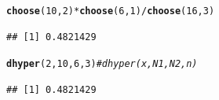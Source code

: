 \documentclass[t,xcolor=pdftex,dvipsnames,table]{beamer}\usepackage[]{graphicx}\usepackage[]{color}
\makeatletter
\newcommand{\hlnum}[1]{\textcolor[rgb]{0.686,0.059,0.569}{#1}}%
\newcommand{\hlcom}[1]{\textcolor[rgb]{0.678,0.584,0.686}{\textit{#1}}}%
\newcommand{\hlopt}[1]{\textcolor[rgb]{0,0,0}{#1}}%
\newcommand{\hlstd}[1]{\textcolor[rgb]{0.345,0.345,0.345}{#1}}%
\newcommand{\hlkwd}[1]{\textcolor[rgb]{0.737,0.353,0.396}{\textbf{#1}}}%
\newenvironment{kframe}{%
 \def\at@end@of@kframe{}%
 \ifinner\ifhmode%
  \def\at@end@of@kframe{\end{minipage}}%
  \begin{minipage}{\columnwidth}%
 \fi\fi%
 \def\FrameCommand##1{\hskip\@totalleftmargin \hskip-\fboxsep
 \colorbox{shadecolor}{##1}\hskip-\fboxsep
     \hskip-\linewidth \hskip-\@totalleftmargin \hskip\columnwidth}%
 \MakeFramed {\advance\hsize-\width
   \@totalleftmargin\z@ \linewidth\hsize
   \@setminipage}}%
 {\par\unskip\endMakeFramed%
 \at@end@of@kframe}
\newenvironment{knitrout}{}{} %
\makeatother
\begin{document}
\begin{frame}[fragile]{}
\begin{knitrout}
\color{fgcolor}\begin{kframe}
\begin{alltt}
\hlkwd{choose}\hlstd{(}\hlnum{10}\hlstd{,}\hlnum{2}\hlstd{)}\hlopt{*}\hlkwd{choose}\hlstd{(}\hlnum{6}\hlstd{,}\hlnum{1}\hlstd{)}\hlopt{/}\hlkwd{choose}\hlstd{(}\hlnum{16}\hlstd{,}\hlnum{3}\hlstd{)}
\end{alltt}
\begin{verbatim}
## [1] 0.4821429
\end{verbatim}
\end{kframe}
\end{knitrout}

\begin{knitrout}
\color{fgcolor}\begin{kframe}
\begin{alltt}
\hlkwd{dhyper}\hlstd{(}\hlnum{2}\hlstd{,}\hlnum{10}\hlstd{,}\hlnum{6}\hlstd{,}\hlnum{3}\hlstd{)}   \hlcom{# dhyper(x,N1,N2,n)}
\end{alltt}
\begin{verbatim}
## [1] 0.4821429
\end{verbatim}
\end{kframe}
\end{knitrout}

\end{frame}
\end{document}
